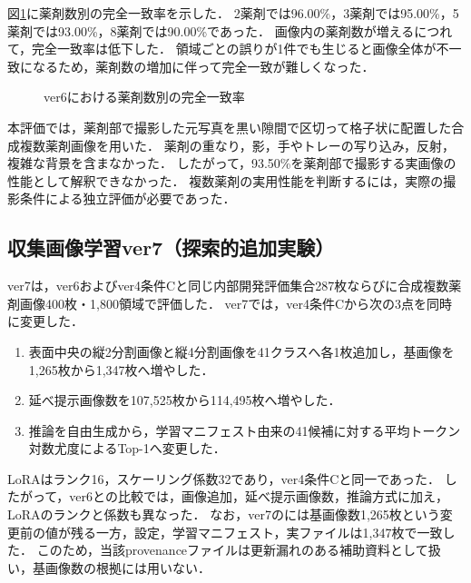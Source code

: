 \documentclass[uplatex,dvipdfmx]{jsarticle}
\begin{document}
図\ref{fig:multi_count}に薬剤数別の完全一致率を示した．
2薬剤では96.00\%，3薬剤では95.00\%，5薬剤では93.00\%，8薬剤では90.00\%であった．
画像内の薬剤数が増えるにつれて，完全一致率は低下した．
領域ごとの誤りが1件でも生じると画像全体が不一致になるため，薬剤数の増加に伴って完全一致が難しくなった．

\begin{figure}[H]
  \centering
  \caption{ver6における薬剤数別の完全一致率}
  \label{fig:multi_count}
\end{figure}

本評価では，薬剤部で撮影した元写真を黒い隙間で区切って格子状に配置した合成複数薬剤画像を用いた．
薬剤の重なり，影，手やトレーの写り込み，反射，複雑な背景を含まなかった．
したがって，93.50\%を薬剤部で撮影する実画像の性能として解釈できなかった．
複数薬剤の実用性能を判断するには，実際の撮影条件による独立評価が必要であった．

\subsection{収集画像学習ver7（探索的追加実験）}\label{sec:ver7_results}

ver7は，ver6およびver4条件Cと同じ内部開発評価集合287枚ならびに合成複数薬剤画像400枚・1,800領域で評価した．
ver7では，ver4条件Cから次の3点を同時に変更した．
\begin{enumerate}
  \item 表面中央の縦2分割画像と縦4分割画像を41クラスへ各1枚追加し，基画像を1,265枚から1,347枚へ増やした．
  \item 延べ提示画像数を107,525枚から114,495枚へ増やした．
  \item 推論を自由生成から，学習マニフェスト由来の41候補に対する平均トークン対数尤度による\mbox{Top-1}へ変更した．
\end{enumerate}
LoRAはランク16，スケーリング係数32であり，ver4条件Cと同一であった．
したがって，ver6との比較では，画像追加，延べ提示画像数，推論方式に加え，LoRAのランクと係数も異なった．
なお，ver7のには基画像数1,265枚という変更前の値が残る一方，設定，学習マニフェスト，実ファイルは1,347枚で一致した．
このため，当該provenanceファイルは更新漏れのある補助資料として扱い，基画像数の根拠には用いない．
\end{document}
